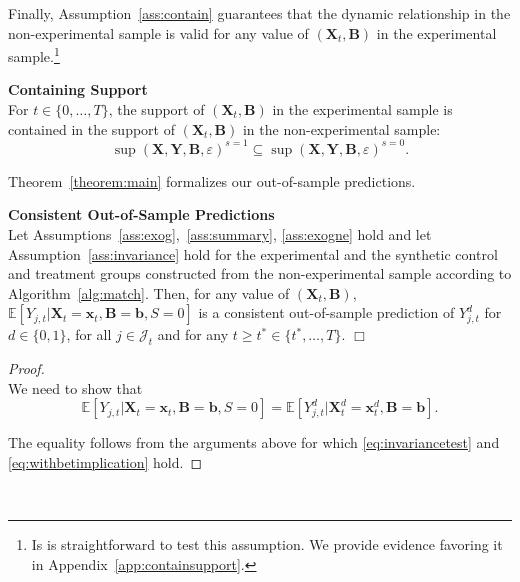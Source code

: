 \noindent Finally, Assumption~\ref{ass:contain} guarantees that the dynamic relationship in the non-experimental sample is valid for any value of $\left( \bm{X}_{t}, \bm{B} \right)$ in the experimental sample.\footnote{Is is straightforward to test this assumption. We provide evidence favoring it in Appendix~\ref{app:containsupport}.}\\

\onehalfspacing
\begin{assumption} \label{ass:contain} \textbf{Containing Support} \\
For $t \in \{ 0, \ldots, T \}$, the support of $\left( \bm{X}_{t}, \bm{B} \right)$ in the experimental sample is contained in the support of $\left( \bm{X}_{t}, \bm{B} \right)$ in the non-experimental sample: 
\begin{equation}
\sup(\bm{X}, \bm{Y}, \bm{B}, \varepsilon)^{s=1} \subseteq \sup (\bm{X}, \bm{Y}, \bm{B}, \varepsilon)^{s=0}.
\end{equation}
\end{assumption}
\doublespacing

\noindent Theorem~\ref{theorem:main} formalizes our out-of-sample predictions.\\

\onehalfspacing
\begin{theorem} \textbf{Consistent Out-of-Sample Predictions} \label{theorem:main} \\
Let Assumptions~\ref{ass:exog},~\ref{ass:summary}, \ref{ass:exogne} hold and let Assumption~\ref{ass:invariance} hold for the experimental and the synthetic control and treatment groups constructed from the non-experimental sample according to Algorithm~\ref{alg:match}. Then, for any value of $\left( \bm{X}_{t}, \bm{B} \right)$, $\mathbb{E} \left[ Y_{j,t} | \bm{X}_{t} = \bm{x}_{t}, \bm{B} = \bm{b}, S = 0 \right]$ is a consistent out-of-sample prediction of $Y_{j,t}^d$ for $d \in \{ 0, 1\}$, for all $j \in \mathcal{J}_{t}$ and for any $t \geq t^* \in \{t^*, \ldots, T \}$. $\Box$ 
\end{theorem}

\noindent \begin{proof}\\
We need to show that  
\begin{equation}
\mathbb{E} \left[ Y_{j,t} | \bm{X}_{t} = \bm{x}_{t}, \bm{B} = \bm{b}, S = 0 \right] = \mathbb{E} \left[ Y_{j,t}^d | \bm{X}_{t}^d = \bm{x}_t^d, \bm{B} = \bm{b}  \right].
\end{equation}

\noindent The equality follows from the arguments above for which \eqref{eq:invariancetest} and \eqref{eq:withbetimplication} hold.
\end{proof}\\
\doublespacing


